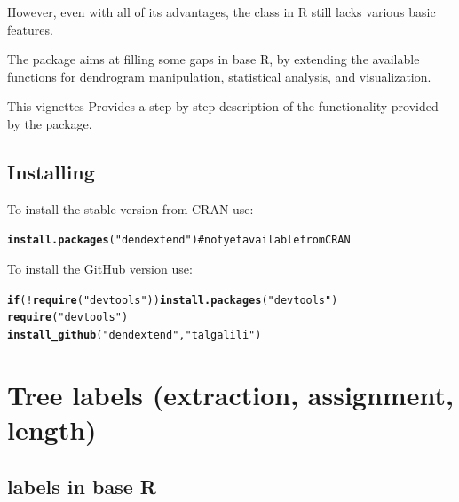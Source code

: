 \documentclass[shortnames,nojss,article]{jss}\usepackage{graphicx, color}
\makeatletter
\newcommand{\hlfunctioncall}[1]{\textcolor[rgb]{0.501960784313725,0,0.329411764705882}{\textbf{#1}}}%
\newcommand{\hlstring}[1]{\textcolor[rgb]{0.6,0.6,1}{#1}}%
\newenvironment{kframe}{%
 \def\at@end@of@kframe{}%
 \ifinner\ifhmode%
  \def\at@end@of@kframe{\end{minipage}}%
  \begin{minipage}{\columnwidth}%
 \fi\fi%
 \def\FrameCommand##1{\hskip\@totalleftmargin \hskip-\fboxsep
 \colorbox{shadecolor}{##1}\hskip-\fboxsep
     \hskip-\linewidth \hskip-\@totalleftmargin \hskip\columnwidth}%
 \MakeFramed {\advance\hsize-\width
   \@totalleftmargin\z@ \linewidth\hsize
   \@setminipage}}%
 {\par\unskip\endMakeFramed%
 \at@end@of@kframe}
\newenvironment{knitrout}{}{} %
\makeatother
\begin{document}
However, even with all of its advantages, the  class in R still lacks various basic features.

The  package aims at filling some gaps in base R, by extending the available functions for dendrogram manipulation, statistical analysis, and visualization.

This vignettes Provides a step-by-step description of the functionality provided by the  package.


\subsection{Installing }

To install the stable version from CRAN use:

\begin{knitrout}
\color{fgcolor}\begin{kframe}
\begin{alltt}
\hlfunctioncall{install.packages}(\hlstring{"dendextend"})  # not yet available from CRAN
\end{alltt}
\end{kframe}
\end{knitrout}



To install the \href{https://github.com/talgalili/dendextend}{GitHub version} use:

\begin{knitrout}
\color{fgcolor}\begin{kframe}
\begin{alltt}
\hlfunctioncall{if} (!\hlfunctioncall{require}(\hlstring{"devtools"})) \hlfunctioncall{install.packages}(\hlstring{"devtools"})
\hlfunctioncall{require}(\hlstring{"devtools"})
\hlfunctioncall{install_github}(\hlstring{"dendextend"}, \hlstring{"talgalili"})
\end{alltt}
\end{kframe}
\end{knitrout}



\section{Tree labels (extraction, assignment, length)}


\subsection{labels in base R}
\end{document}
